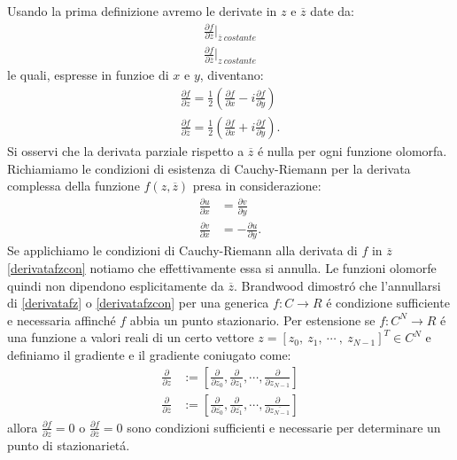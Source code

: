 \documentclass[a4paper,12pt]{report}
\begin{document}
 Usando la prima definizione avremo le derivate in $z$ e $\overline{z}$ date da:
 \begin{align}
  \frac{\partial f}{\partial z}\bigg|_{\overline{z} \ costante}\\
  \frac{\partial f}{\partial \overline{z}}\bigg|_{z \ costante}
 \end{align}
 le quali, espresse in funzioe di $x$ e $y$, diventano:
 \begin{align}
  \frac{\partial f}{\partial z} = \frac{1}{2}\left(\frac{\partial f}{\partial x}-i\frac{\partial f}{\partial y}\right)\label{derivatafz}\\
  \frac{\partial f}{\partial \overline{z}} = \frac{1}{2}\left(\frac{\partial f}{\partial x}+i\frac{\partial f}{\partial y}\right).\label{derivatafzcon}
 \end{align}
 Si osservi che la derivata parziale rispetto a $\overline{z}$ \'e nulla per ogni funzione olomorfa. 
 Richiamiamo le condizioni di esistenza di Cauchy-Riemann per la derivata complessa della funzione $f(z,\overline{z})$ presa in considerazione:
 \begin{align}
  \frac{\partial u}{\partial x} &= \frac{\partial v}{\partial y}\\
  \frac{\partial v}{\partial x} &=- \frac{\partial u}{\partial y}.
 \end{align}
 Se applichiamo le condizioni di Cauchy-Riemann alla derivata di $f$ in $\overline{z}$ \ref{derivatafzcon} notiamo che effettivamente essa si annulla. 
 Le funzioni olomorfe quindi non dipendono esplicitamente da $\overline{z}$. 
 Brandwood dimostr\'o che l'annullarsi di \ref{derivatafz} o \ref{derivatafzcon} per una generica $f:C\rightarrow R$ \'e condizione sufficiente e necessaria affinch\'e $f$ abbia un punto stazionario. 
 Per estensione se $f:C^N\rightarrow R$ \'e una funzione a valori reali di un certo vettore $z=\left[ z_0, \ z_1, \ \cdots \ , \ z_{N-1}\right]^T \in C^N$ e definiamo il gradiente e il gradiente coniugato come:
 \begin{align}
  \frac{\partial}{\partial z} &:=\left[ \frac{\partial}{\partial z_0},\frac{\partial}{\partial z_1},\cdots ,\frac{\partial}{\partial z_{N-1}}\right]\\
  \frac{\partial}{\partial \overline{z}} &:=\left[ \frac{\partial}{\partial \overline{z_0}},\frac{\partial}{\partial \overline{z_1}},\cdots ,\frac{\partial}{\partial \overline{z_{N-1}}}\right]
 \end{align}
 allora $\frac{\partial f}{\partial z}=0$ o $\frac{\partial f}{\partial \overline{z}}=0$ sono condizioni sufficienti e necessarie per determinare un punto di stazionariet\'a. 
\end{document}
